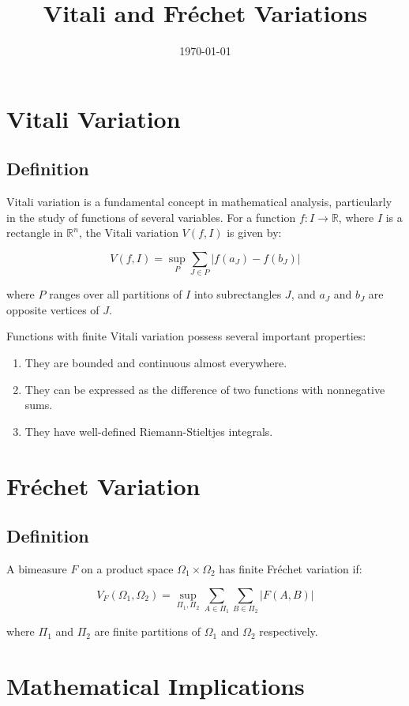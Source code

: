 \documentclass[12pt]{article}
\title{Vitali and Fr\'echet Variations}
\author{}
\date{\today}
\begin{document}
\maketitle

\section{Vitali Variation}
\subsection{Definition}
Vitali variation is a fundamental concept in mathematical analysis, particularly in the study of functions of several variables. For a function $f: I \to \mathbb{R}$, where $I$ is a rectangle in $\mathbb{R}^n$, the Vitali variation $V(f, I)$ is given by:

\[V(f,I)=\sup_P \sum_{J\in P}|f(a_J)-f(b_J)|\]

where $P$ ranges over all partitions of $I$ into subrectangles $J$, and $a_J$ and $b_J$ are opposite vertices of $J$.

Functions with finite Vitali variation possess several important properties:
\begin{enumerate}
    \item They are bounded and continuous almost everywhere.
    \item They can be expressed as the difference of two functions with nonnegative sums.
    \item They have well-defined Riemann-Stieltjes integrals.
\end{enumerate}

\section{Fr\'echet Variation}
\subsection{Definition}
A bimeasure $F$ on a product space $\Omega_1 \times \Omega_2$ has finite Fr\'echet variation if:

\[V_F(\Omega_1,\Omega_2)=\sup_{\Pi_1,\Pi_2}\sum_{A\in \Pi_1}\sum_{B\in \Pi_2}|F(A,B)|\]

where $\Pi_1$ and $\Pi_2$ are finite partitions of $\Omega_1$ and $\Omega_2$ respectively.

\section{Mathematical Implications}
\end{document}
